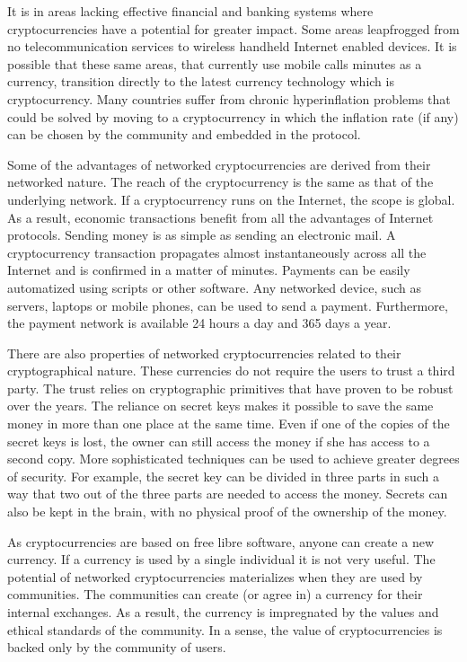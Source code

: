 \documentclass[journal]{IEEEtran}
\begin{document}
It is in areas lacking effective financial and banking systems where cryptocurrencies have a potential for greater impact.
Some areas leapfrogged from no telecommunication services to wireless handheld Internet enabled devices.
It is possible that these same areas, that currently use mobile calls minutes as a currency, transition directly to the latest currency technology which is cryptocurrency.
Many countries suffer from chronic hyperinflation problems that could be solved by moving to a cryptocurrency in which the inflation rate (if any) can be chosen by the community and embedded in the protocol.

Some of the advantages of networked cryptocurrencies are derived from their networked nature.
The reach of the cryptocurrency is the same as that of the underlying network.
If a cryptocurrency runs on the Internet, the scope is global.
As a result, economic transactions benefit from all the advantages of Internet protocols.
Sending money is as simple as sending an electronic mail.
A cryptocurrency transaction propagates almost instantaneously across all the Internet and is confirmed in a matter of minutes.
Payments can be easily automatized using scripts or other software.
Any networked device, such as servers, laptops or mobile phones, can be used to send a payment.
Furthermore, the payment network is available 24 hours a day and 365 days a year.

There are also properties of networked cryptocurrencies related to their cryptographical nature.
These currencies do not require the users to trust a third party.
The trust relies on cryptographic primitives that have proven to be robust over the years.
The reliance on secret keys makes it possible to save the same money in more than one place at the same time.
Even if one of the copies of the secret keys is lost, the owner can still access the money if she has access to a second copy.
More sophisticated techniques can be used to achieve greater degrees of security. 
For example, the secret key can be divided in three parts in such a way that two out of the three parts are needed to access the money.
Secrets can also be kept in the brain, with no physical proof of the ownership of the money.

As cryptocurrencies are based on free libre software, anyone can create a new currency.
If a currency is used by a single individual it is not very useful.
The potential of networked cryptocurrencies materializes when they are used by communities.
The communities can create (or agree in) a currency for their internal exchanges.
As a result, the currency is impregnated by the values and ethical standards of the community.
In a sense, the value of cryptocurrencies is backed only by the community of users.
\end{document}
